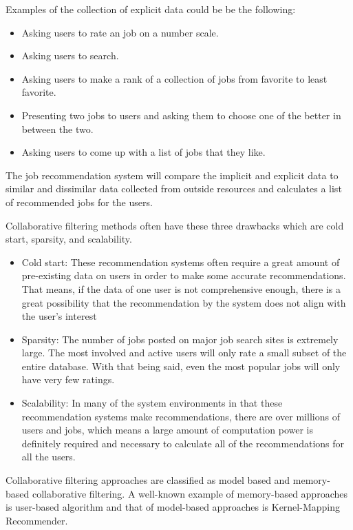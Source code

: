 \documentclass[sigconf]{acmart}
\begin{document}
\par Examples of the collection of explicit data could be be the following:
 
\begin{itemize}
  \item Asking users to rate an job on a number scale.
  \item Asking users to search.
  \item Asking users to make a rank of a collection of jobs from favorite to least favorite.
  \item Presenting two jobs to users and asking them to choose one of the better in between the two.
  \item Asking  users to come up with a list of jobs that they like.
\end{itemize}

\par The job recommendation system will compare the implicit and explicit data to similar and dissimilar data collected from outside resources and calculates a list of recommended jobs for the users. 

\par Collaborative filtering methods often have these three drawbacks which are cold start, sparsity, and scalability.

\begin{itemize}
  \item Cold start: These recommendation systems often require a great amount of pre-existing data on users in order to make some accurate recommendations. That means, if the data of one user is not comprehensive enough, there is a great possibility that the recommendation by the system does not align with the user's interest
  \item Sparsity: The number of jobs posted on major job search sites is extremely large. The most involved and active users will only rate a small subset of the entire database. With that being said, even the most popular jobs will only have very few ratings.
  \item Scalability: In many of the system environments in that these recommendation systems make recommendations, there are over millions of users and jobs, which means a large amount of computation power is definitely required and necessary to calculate all of the recommendations for all the users.

\end{itemize}

\par Collaborative filtering approaches are classified as model based and memory-based collaborative filtering. A well-known example of memory-based approaches is user-based algorithm and that of model-based approaches is Kernel-Mapping Recommender.
\end{document}
